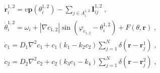 \documentclass{article}
\begin{document}
\begin{subequations}
    \begin{align}
        &\dot{\mathbf{r}}_{i}^{1,2}=v\mathbf{p}\left( \theta _{i}^{1,2} \right) -\sum_{j\in A_{i}^{1,2}}{\mathbf{I}_{ij}^{1,2}\;,}\label{dotR}\\
        &\dot{\theta}_{i}^{1,2}=\omega_i + \left| \nabla c_{1,2} \right|\sin \left( \varphi _{c_{1,2}}-\theta _{i}^{1,2} \right) +F\left( \theta ,\mathbf{r} \right) \;,\label{dotTheta}\\
        &\dot{c}_1=D_1\nabla ^2c_1+c_1\left( k_1-k_2c_2 \right) \sum_{j=1}^N{\delta \left( \mathbf{r}-\mathbf{r}_{j}^{1} \right) \;,}\\
        &\dot{c}_2=D_2\nabla ^2c_2+c_2\left( k_3c_1-k_4 \right) \sum_{j=1}^N{\delta \left( \mathbf{r}-\mathbf{r}_{j}^{2} \right) \;,}
    \end{align}
\end{subequations}
\end{document}
